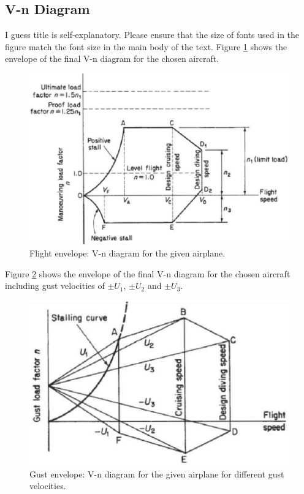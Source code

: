 \subsection{V-n Diagram}
I guess title is self-explanatory.
Please ensure that the size of fonts used in the figure match the font size in the main body of the text.
Figure \ref{fig:V_n_diag} shows the envelope of the final V-n diagram for the chosen aircraft.
%
\begin{figure}
    \begin{center}
      \includegraphics[width=6in]{figures/V_n_diag.eps}
\caption{Flight envelope: V-n diagram for the given airplane.}
       \label{fig:V_n_diag}
    \end{center}
\end{figure}
%

Figure \ref{fig:V_n_gust} shows the envelope of the final V-n diagram for the chosen aircraft including gust velocities of $\pm U_1$, $\pm U_2$ and $\pm U_3$.
%
\begin{figure}
    \begin{center}
      \includegraphics[width=4.5in]{figures/V_n_gust.eps}
     \caption{Gust envelope: V-n diagram for the given airplane for different gust velocities.}
       \label{fig:V_n_gust}
    \end{center}
\end{figure}
%
